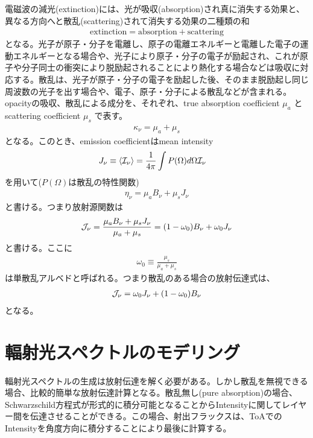 電磁波の減光(extinction)には、光が吸収(absorption)され真に消失する効果と、異なる方向へと散乱(scattering)されて消失する効果の二種類の和
\begin{align}
\mathrm{extinction = absorption + scattering}
\label{eq:extsa}
\end{align}
となる。光子が原子・分子を電離し、原子の電離エネルギーと電離した電子の運動エネルギーとなる場合や、光子により原子・分子の電子が励起され、これが原子や分子同士の衝突により脱励起されることにより熱化する場合などは吸収に対応する。散乱は、光子が原子・分子の電子を励起した後、そのまま脱励起し同じ周波数の光子を出す場合や、電子、原子・分子による散乱などが含まれる。opacityの吸収、散乱による成分を、それぞれ、true absorption coefficient $\mu_a$ とscattering coefficient $\mu_s$ で表す。
\begin{align}
\kappa_\nu = \mu_a + \mu_s
\label{eq:extsaa}
\end{align}
となる。このとき、emission coefficientはmean intensity 
\begin{align}
{J_\nu} &\equiv  \langle {\mathcal{I}_\nu} \rangle = \frac{1}{4 \pi} \int P(\Omega) d \Omega {\mathcal{I}_\nu}
\end{align}
を用いて($P(\Omega)$は散乱の特性関数)
\begin{align}
\eta_\nu = \mu_a B_\nu + \mu_s {J_\nu}
\label{eq:emisaa}
\end{align}
と書ける。つまり放射源関数は
\begin{align}
{\mathcal{J}_\nu} = \frac{\mu_a B_\nu + \mu_s {J_\nu}}{\mu_a + \mu_s} = (1 - \omega_0) B_\nu + \omega_0 {J_\nu}
\label{eq:sourcef}
\end{align}
と書ける。ここに
\begin{align}
\omega_0 \equiv \frac{\mu_s}{\mu_a  + \mu_s}
\label{eq:sia}
\end{align}
は単散乱アルベドと呼ばれる。つまり散乱のある場合の放射伝達式は、
\begin{align}
\label{eq:rtscat}
{\mathcal{J}_\nu} = \omega_0 J_\nu + (1 - \omega_0 ) B_\nu
\end{align}
となる。

\section{輻射光スペクトルのモデリング}

輻射光スペクトルの生成は放射伝達を解く必要がある。しかし散乱を無視できる場合、比較的簡単な放射伝達計算となる。散乱無し(pure absorption)の場合、Schwarzschild方程式が形式的に積分可能となることからIntensityに関してレイヤー間を伝達させることができる。この場合、射出フラックスは、ToAでのIntensityを角度方向に積分することにより最後に計算する。

